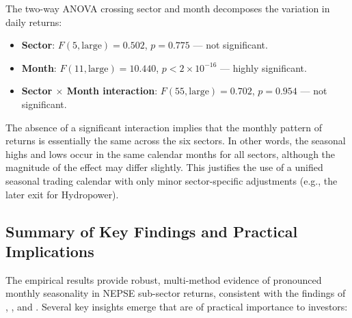\documentclass[12pt,a4paper,fleqn]{article}
\begin{document}
The two-way ANOVA crossing sector and month decomposes the variation in daily returns:
\begin{itemize}
    \item \textbf{Sector}: \(F(5, \text{large}) = 0.502\), \(p = 0.775\) — not significant.
    \item \textbf{Month}: \(F(11, \text{large}) = 10.440\), \(p < 2\times10^{-16}\) — highly significant.
    \item \textbf{Sector \(\times\) Month interaction}: \(F(55, \text{large}) = 0.702\), \(p = 0.954\) — not significant.
\end{itemize}
The absence of a significant interaction implies that the monthly pattern of returns is essentially the same across the six sectors. In other words, the seasonal highs and lows occur in the same calendar months for all sectors, although the magnitude of the effect may differ slightly. This justifies the use of a unified seasonal trading calendar with only minor sector-specific adjustments (e.g., the later exit for Hydropower).

\subsection{Summary of Key Findings and Practical Implications}

The empirical results provide robust, multi-method evidence of pronounced monthly seasonality in NEPSE sub-sector returns, consistent with the findings of \cite{gurung2024fiscal}, \cite{rijal2025turn}, and \cite{shrestha2023seasonal}. Several key insights emerge that are of practical importance to investors:
\end{document}
